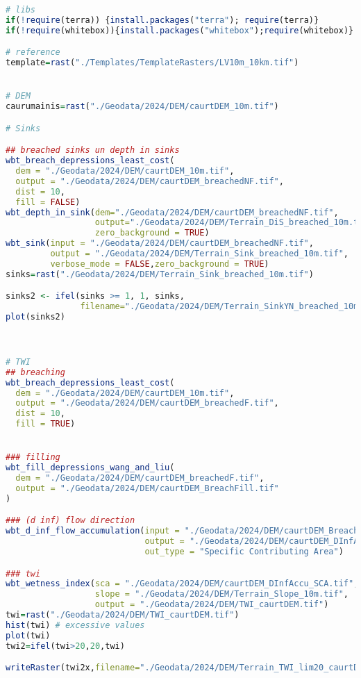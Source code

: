 \documentclass[
]{book}
\begin{document}
\begin{lstlisting}[language=R]
# libs
if(!require(terra)) {install.packages("terra"); require(terra)}
if(!require(whitebox)){install.packages("whitebox");require(whitebox)}

# reference
template=rast("./Templates/TemplateRasters/LV10m_10km.tif")


# DEM
caurumainis=rast("./Geodata/2024/DEM/caurtDEM_10m.tif")

# Sinks

## breached sinks un depth in sinks
wbt_breach_depressions_least_cost(
  dem = "./Geodata/2024/DEM/caurtDEM_10m.tif",
  output = "./Geodata/2024/DEM/caurtDEM_breachedNF.tif",
  dist = 10,
  fill = FALSE)
wbt_depth_in_sink(dem="./Geodata/2024/DEM/caurtDEM_breachedNF.tif",
                  output="./Geodata/2024/DEM/Terrain_DiS_breached_10m.tif",
                  zero_background = TRUE)
wbt_sink(input = "./Geodata/2024/DEM/caurtDEM_breachedNF.tif",
         output = "./Geodata/2024/DEM/Terrain_Sink_breached_10m.tif",
         verbose_mode = FALSE,zero_background = TRUE)
sinks=rast("./Geodata/2024/DEM/Terrain_Sink_breached_10m.tif")

sinks2 <- ifel(sinks >= 1, 1, sinks,
               filename="./Geodata/2024/DEM/Terrain_SinkYN_breached_10m.tif")
plot(sinks2)



# TWI
## breaching
wbt_breach_depressions_least_cost(
  dem = "./Geodata/2024/DEM/caurtDEM_10m.tif",
  output = "./Geodata/2024/DEM/caurtDEM_breachedF.tif",
  dist = 10,
  fill = TRUE)


### filling
wbt_fill_depressions_wang_and_liu(
  dem = "./Geodata/2024/DEM/caurtDEM_breachedF.tif",
  output = "./Geodata/2024/DEM/caurtDEM_BreachFill.tif"
)

### (d inf) flow direction
wbt_d_inf_flow_accumulation(input = "./Geodata/2024/DEM/caurtDEM_BreachFill.tif",
                            output = "./Geodata/2024/DEM/caurtDEM_DInfAccu_SCA.tif",
                            out_type = "Specific Contributing Area")

### twi
wbt_wetness_index(sca = "./Geodata/2024/DEM/caurtDEM_DInfAccu_SCA.tif",
                  slope = "./Geodata/2024/DEM/Terrain_Slope_10m.tif",
                  output = "./Geodata/2024/DEM/TWI_caurtDEM.tif")
twi=rast("./Geodata/2024/DEM/TWI_caurtDEM.tif")
hist(twi) # excessive values
plot(twi)
twi2=ifel(twi>20,20,twi)

writeRaster(twi2x,filename="./Geodata/2024/DEM/Terrain_TWI_lim20_caurtDEM.tif")
\end{lstlisting}
\end{document}
